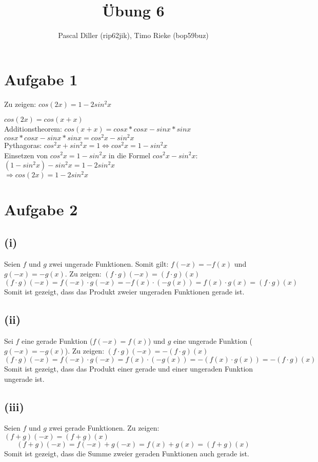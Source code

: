 \documentclass{article}
\title{Übung 6}
\author{Pascal Diller (rip62jik), Timo Rieke (bop59buz)}
\begin{document}
\maketitle

\section{Aufgabe 1}
Zu zeigen: $cos(2x) = 1 - 2 sin^2 x$ 
\begin{center}
    $cos(2x) = cos(x+x)$ \\
    Additionstheorem: $cos(x+x) = cos x * cosx - sinx* sinx$ \\
    $cosx*cosx-sinx*sinx = cos^2x - sin^2x$ \\
    Pythagoras: $cos^2x+sin^2x=1 \Longleftrightarrow cos^2x = 1-sin^2x$ \\
    Einsetzen von $cos^2x = 1-sin^2x$ in die Formel $cos^2x - sin^2x$:\\
    $(1-sin^2x) - sin^2x = 1- 2sin^2x$\\
    $\Longrightarrow cos(2x) = 1-2sin^2x$ 
\end{center}

\section{Aufgabe 2}
\subsection{(i)}
Seien $f$ und $g$ zwei ungerade Funktionen. Somit gilt: $f(-x) = -f(x)$ und $g(-x) = -g(x)$. Zu zeigen: $(f \cdot g)(-x) = (f \cdot g)(x)$
\[(f \cdot g)(-x) = f(-x) \cdot g(-x) = -f(x) \cdot (-g(x)) = f(x) \cdot g(x) = (f \cdot g)(x)\]
Somit ist gezeigt, dass das Produkt zweier ungeraden Funktionen gerade ist.

\subsection{(ii)}
Sei $f$ eine gerade Funktion ($f(-x)=f(x)$) und $g$ eine ungerade Funktion ($g(-x)=-g(x)$).
Zu zeigen: $(f \cdot g)(-x) = -(f \cdot g)(x)$
\[(f \cdot g)(-x) = f(-x) \cdot g(-x) = f(x) \cdot (-g(x)) = -(f(x) \cdot g(x)) = -(f \cdot g)(x)\]
Somit ist gezeigt, dass das Produkt einer gerade und einer ungeraden Funktion ungerade ist.

\subsection{(iii)}
Seien $f$ und $g$ zwei gerade Funktionen. Zu zeigen: $(f + g)(-x) = (f + g)(x)$
\[(f + g)(-x) = f(-x) + g(-x) = f(x) + g(x) = (f+g)(x)\]
Somit ist gezeigt, dass die Summe zweier geraden Funktionen auch gerade ist.
\end{document}
